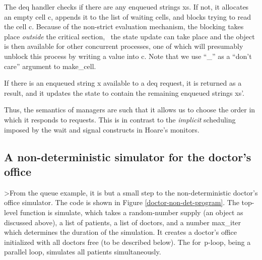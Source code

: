 The {\cf deq} handler checks if there are any enqueued strings {\cf
xs}.  If not, it allocates an empty cell {\cf c}, appends it to the
list of waiting cells, and blocks trying to read the cell {\cf c}.
Because of the non-strict evaluation mechanism, the blocking takes
place {\em outside\/} the critical section, \ie\ the state update can
take place and the object is then available for other concurrent
processes, one of which will presumably unblock this process by
writing a value into {\cf c}.  Note that we use ``{\cf \_}'' as a
``don't care'' argument to {\cf make\_cell}.

If there is an enqueued string {\cf x} available to a {\cf deq}
request, it is returned as a result, and it updates the state to
contain the remaining enqueued strings {\cf xs'}.

Thus, the semantics of managers are such that it allows us to choose
the order in which it responds to requests.  This is in contrast to
the {\em implicit\/} scheduling imposed by the {\cf wait} and {\cf
signal} constructs in Hoare's monitors.

\subsection{A non-deterministic simulator for the doctor's office}

>From the queue example, it is but a small step to the
non-deterministic doctor's office simulator.  The code is shown in
Figure \ref{doctor-non-det-program}.  The top-level function is {\cf
simulate}, which takes a random-number supply (an object as discussed
above), a list of patients, a list of doctors, and a number {\cf
max\_iter} which determines the duration of the simulation.  It
creates a doctor's office initialized with all doctors free (to be
described below).  The \mbox{\cf for p}-loop, being a parallel loop,
simulates all patients simultaneously.

